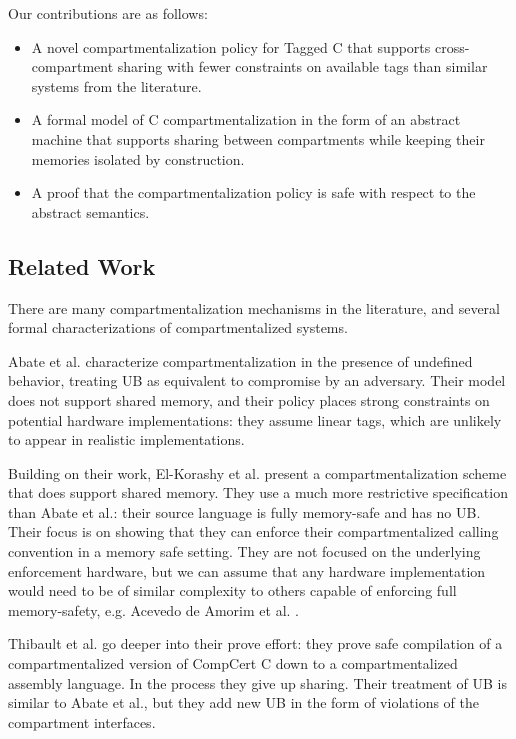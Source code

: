 \documentclass{article}
\begin{document}
Our contributions are as follows:
\begin{itemize}
\item A novel compartmentalization policy for Tagged C that supports cross-compartment
  sharing with fewer constraints on available tags than similar systems from the literature.
\item A formal model of C compartmentalization in the form of an abstract machine that
  supports sharing between compartments while keeping their memories isolated by construction.
\item A proof that the compartmentalization policy is safe with respect to the abstract semantics.
\end{itemize}

\subsection{Related Work}

There are many compartmentalization mechanisms in the literature, and several formal
characterizations of compartmentalized systems.

Abate et al. \cite{Abate18:GoodComponentsBad} characterize compartmentalization in the
presence of undefined behavior, treating UB as equivalent to compromise by an adversary.
Their model does not support shared memory, and their policy places strong constraints on potential
hardware implementations: they assume linear tags, which are unlikely to appear
in realistic implementations.

Building on their work, El-Korashy et al. \cite{ElKorashy22:SecurePtrs} present a compartmentalization
scheme that does support shared memory. They use a much more restrictive specification
than Abate et al.: their source language is fully memory-safe and has no UB. Their
focus is on showing that they can enforce their compartmentalized calling convention
in a memory safe setting. They are not focused on the underlying enforcement hardware,
but we can assume that any hardware implementation would need to be of similar complexity
to others capable of enforcing full memory-safety, e.g. Acevedo de Amorim et al.
\cite{AdA18:MeaningMemorySafety}. 

Thibault et al. \cite{} go deeper into their prove effort: they prove safe compilation of a
compartmentalized version of CompCert C down to a compartmentalized assembly language.
In the process they give up sharing. Their treatment of UB is similar to Abate et al.,
but they add new UB in the form of violations of the compartment interfaces.
\end{document}

